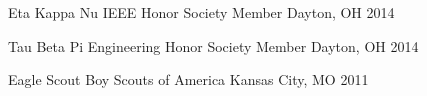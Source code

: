 \begin{cvhonors}
\cvhonor
{Eta Kappa Nu IEEE Honor Society} %
{Member} %
{Dayton, OH} %
{2014} %


\cvhonor
{Tau Beta Pi Engineering Honor Society} %
{Member} %
{Dayton, OH} %
{2014} %


\cvhonor
{Eagle Scout} %
{Boy Scouts of America} %
{Kansas City, MO} %
{2011} %


\end{cvhonors}
